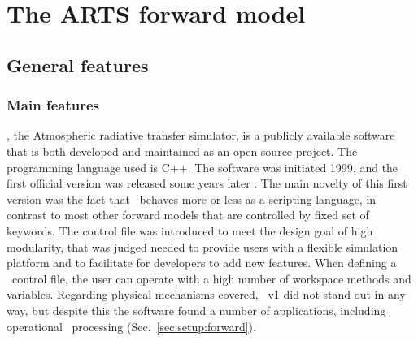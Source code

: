 \chapter{The ARTS forward model}
\label{chapter:arts}


\section{General features}
\label{sec:arts:features}

\subsection{Main features}
%
\ARTS, the Atmospheric radiative transfer simulator, is a publicly available
software that is both developed and maintained as an open source project. The
programming language used is C++. The software was initiated 1999, and the
first official version was released some years later \citep{buehler:artst:05}.
The main novelty of this first version was the fact that \ARTS\ behaves more or
less as a scripting language, in contrast to most other forward models that are
controlled by fixed set of keywords. The control file was introduced to meet
the design goal of high modularity, that was judged needed to provide users
with a flexible simulation platform and to facilitate for developers to add new
features. When defining a \ARTS\ control file, the user can operate with a high
number of workspace methods and variables. Regarding physical mechanisms
covered, \ARTS\ v1 did not stand out in any way, but despite this the software
found a number of applications, including operational \SMR\ processing
(Sec.~\ref{sec:setup:forward}).

